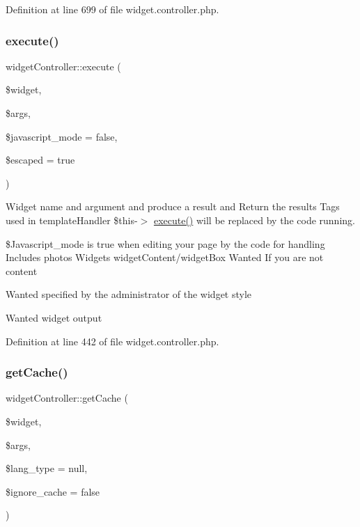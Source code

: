 Definition at line 699 of file widget.\+controller.\+php.

\hypertarget{classwidgetController_a8344d21b83ae400500e70f371817a8d9}{}\label{classwidgetController_a8344d21b83ae400500e70f371817a8d9} 
\subsubsection{\texorpdfstring{execute()}{execute()}}
{\footnotesize\ttfamily widget\+Controller\+::execute (\begin{DoxyParamCaption}\item[{}]{\$widget,  }\item[{}]{\$args,  }\item[{}]{\$javascript\+\_\+mode = {\ttfamily false},  }\item[{}]{\$escaped = {\ttfamily true} }\end{DoxyParamCaption})}



Widget name and argument and produce a result and Return the results Tags used in template\+Handler \$this-\/$>$ \hyperlink{classwidgetController_a8344d21b83ae400500e70f371817a8d9}{execute()} will be replaced by the code running. 

\$\+Javascript\+\_\+mode is true when editing your page by the code for handling Includes photos Widgets widget\+Content/widget\+Box Wanted If you are not content

Wanted specified by the administrator of the widget style

Wanted widget output

Definition at line 442 of file widget.\+controller.\+php.

\hypertarget{classwidgetController_ad866136705c196f9b7b231f58be317eb}{}\label{classwidgetController_ad866136705c196f9b7b231f58be317eb} 
\subsubsection{\texorpdfstring{get\+Cache()}{getCache()}}
{\footnotesize\ttfamily widget\+Controller\+::get\+Cache (\begin{DoxyParamCaption}\item[{}]{\$widget,  }\item[{}]{\$args,  }\item[{}]{\$lang\+\_\+type = {\ttfamily null},  }\item[{}]{\$ignore\+\_\+cache = {\ttfamily false} }\end{DoxyParamCaption})}



